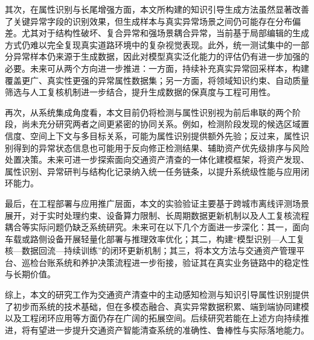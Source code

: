 其次，在属性识别与长尾增强方面，本文所构建的知识引导生成方法虽然显著改善了关键异常字段的识别效果，但生成样本与真实异常场景之间仍可能存在分布偏差。尤其对于结构性破坏、复合异常和强场景耦合异常，当前基于局部编辑的生成方式仍难以完全复现真实道路环境中的复杂视觉表现。此外，统一测试集中的一部分异常样本仍来源于生成数据，因此对模型真实泛化能力的评估仍有进一步加强的必要。未来可从两个方向进一步推进：一方面，持续补充真实异常回采样本，构建覆盖更广、真实性更强的异常属性数据集；另一方面，将领域知识约束、自动质量筛选与人工复核机制进一步结合，提升生成数据的保真度与工程可用性。

再次，从系统集成角度看，本文目前仍将检测与属性识别视为前后串联的两个阶段，尚未充分研究两者之间更紧密的协同关系。例如，检测阶段发现的候选区域置信度、空间上下文与多目标关系，可能为属性识别提供额外先验；反过来，属性识别得到的异常状态信息也可能用于反向修正检测结果、辅助资产优先级排序与风险处置决策。未来可进一步探索面向交通资产清查的一体化建模框架，将资产发现、属性识别、异常研判与结构化记录纳入统一任务链条，以提升系统级性能与应用闭环能力。

最后，在工程部署与应用推广层面，本文的实验验证主要基于跨城市离线评测场景展开，对于实时处理约束、设备算力限制、长周期数据更新机制以及人工复核流程耦合等实际问题仍缺乏系统研究。未来可在以下几个方面进一步深化：其一，面向车载或路侧设备开展轻量化部署与推理效率优化；其二，构建“模型识别—人工复核—数据回流—持续训练”的闭环更新机制；其三，将本文方法与交通资产管理平台、巡检台账系统和养护决策流程进一步衔接，验证其在真实业务链路中的稳定性与长期价值。

综上，本文的研究工作为交通资产清查中的主动感知检测与知识引导属性识别提供了初步而系统的技术基础，但在多模态融合、真实异常数据积累、端到端协同建模以及工程闭环应用等方面仍存在广阔的拓展空间。后续研究若能在上述方向持续推进，将有望进一步提升交通资产智能清查系统的准确性、鲁棒性与实际落地能力。
